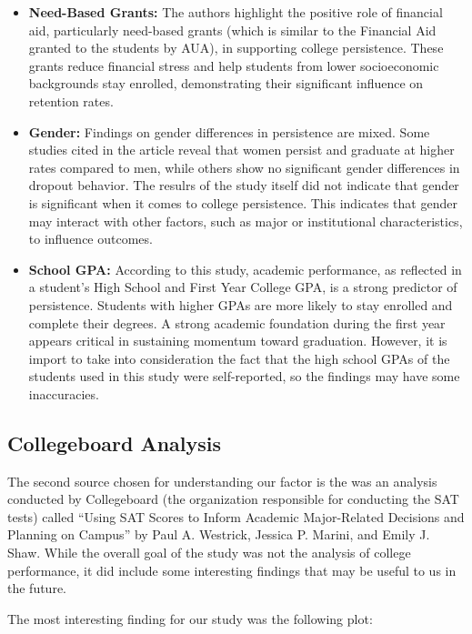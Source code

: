 \documentclass[
  12pt,
]{article}
\begin{document}
\begin{itemize}
\item
  \textbf{Need-Based Grants:} The authors highlight the positive role of
  financial aid, particularly need-based grants (which is similar to the
  Financial Aid granted to the students by AUA), in supporting college
  persistence. These grants reduce financial stress and help students
  from lower socioeconomic backgrounds stay enrolled, demonstrating
  their significant influence on retention rates.
\item
  \textbf{Gender:} Findings on gender differences in persistence are
  mixed. Some studies cited in the article reveal that women persist and
  graduate at higher rates compared to men, while others show no
  significant gender differences in dropout behavior. The resulrs of the
  study itself did not indicate that gender is significant when it comes
  to college persistence. This indicates that gender may interact with
  other factors, such as major or institutional characteristics, to
  influence outcomes.
\item
  \textbf{School GPA:} According to this study, academic performance, as
  reflected in a student's High School and First Year College GPA, is a
  strong predictor of persistence. Students with higher GPAs are more
  likely to stay enrolled and complete their degrees. A strong academic
  foundation during the first year appears critical in sustaining
  momentum toward graduation. However, it is import to take into
  consideration the fact that the high school GPAs of the students used
  in this study were self-reported, so the findings may have some
  inaccuracies.
\end{itemize}

\subsection{Collegeboard Analysis}\label{collegeboard-analysis}

The second source chosen for understanding our factor is the was an
analysis conducted by Collegeboard (the organization responsible for
conducting the SAT tests) called ``Using SAT Scores to Inform Academic
Major-Related Decisions and Planning on Campus'' by Paul A. Westrick,
Jessica P. Marini, and Emily J. Shaw. While the overall goal of the
study was not the analysis of college performance, it did include some
interesting findings that may be useful to us in the future.

The most interesting finding for our study was the following plot:
\end{document}
